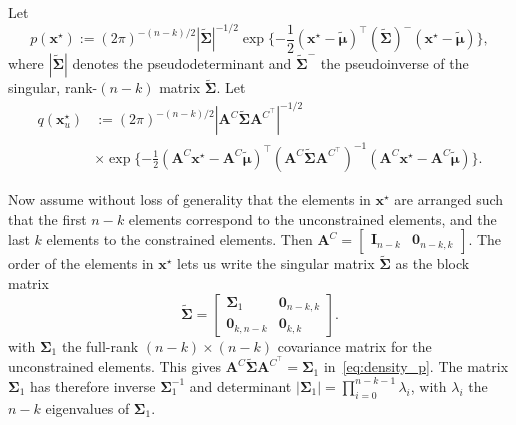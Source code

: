 \documentclass[12pt]{article}
\begin{document}
Let
\begin{equation} \label{eq:density_p}
    p(\bm{x}^{\star}) := (2\pi)^{-(n-k)/2} |\tilde{\bm{\Sigma}}|^{-1/2}
    \exp{ \{-\frac{1}{2} (\bm{x}^{\star} - \tilde{\bm{\mu}})^{\top} (\tilde{\bm{\Sigma}})^{-} (\bm{x}^{\star} - \tilde{\bm{\mu}}) \}},
\end{equation}
where $|\tilde{\bm{\Sigma}}|$ denotes the pseudodeterminant and $\tilde{\bm{\Sigma}}^{-}$ the pseudoinverse of the singular, rank-$(n-k)$ matrix $\tilde{\bm{\Sigma}}$. 
Let 
\begin{equation} \label{eq:density_q}
\begin{split}
    q(\bm{x}_u^{\star}) &:= (2\pi)^{-(n-k)/2} |\bm{A}^C \tilde{\bm{\Sigma}} \bm{A}^{C^{\top}}|^{-1/2} \\
    &\times \exp{\{-\frac{1}{2} (\bm{A}^C \bm{x}^{\star} - \bm{A}^C \tilde{\bm{\mu}})^{\top} (\bm{A}^C \tilde{\bm{\Sigma}} \bm{A}^{C^{\top}})^{-1} (\bm{A}^C\bm{x}^{\star} - \bm{A}^C \tilde{\bm{\mu}})\}}.
\end{split}
\end{equation}

Now assume without loss of generality that the elements in $\bm{x}^{\star}$ are arranged such that the first $n-k$ elements correspond to the unconstrained elements, and the last $k$ elements to the constrained elements. Then  $\bm{A}^{C} = \begin{bmatrix}
    \bm{I}_{n-k} & \bm{0}_{n-k,k}
\end{bmatrix}$.
The order of the elements in $\bm{x}^{\star}$ lets us write the singular matrix $\tilde{\bm{\Sigma}}$ as the block matrix
\begin{equation} \label{eq:Sigma_star}
    \tilde{\bm{\Sigma}} = 
    \begin{bmatrix}
        \bm{\Sigma}_{1} & \bm{0}_{n-k, k} \\
        \bm{0}_{k, n-k} & \bm{0}_{k, k} 
    \end{bmatrix}.
\end{equation}
with $\bm{\Sigma}_{1}$ the full-rank $(n-k) \times (n-k)$ covariance matrix for the unconstrained elements. This gives $\bm{A}^C \tilde{\bm{\Sigma}} \bm{A}^{C^{\top}}=\bm{\Sigma}_{1}$ in~\eqref{eq:density_p}. The matrix $\bm{\Sigma}_{1}$ has therefore inverse $\bm{\Sigma}_{1}^{-1}$ and determinant $|\bm{\Sigma}_{1}| = \prod_{i=0}^{n-k-1}{\lambda_i}$, with $\lambda_i$ the $n-k$ eigenvalues of $\bm{\Sigma}_{1}$.
\end{document}
